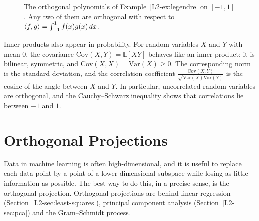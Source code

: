 \begin{figure}[ht]
    \centering
    \caption[Legendre polynomials]{The orthogonal polynomials of Example~\ref{L2-ex:legendre} on $[-1, 1]$. Any two of them are orthogonal with respect to $\langle f, g \rangle = \int_{-1}^1 f(x) g(x) \, dx$.}
    \label{L2-fig:legendre}
\end{figure}

\begin{remark}
    Inner products also appear in probability. For random variables $X$ and $Y$ with mean $0$, the covariance $\mathrm{Cov}(X, Y) = \mathbb{E}[XY]$ behaves like an inner product: it is bilinear, symmetric, and $\mathrm{Cov}(X, X) = \mathrm{Var}(X) \geq 0$. The corresponding norm is the standard deviation, and the correlation coefficient $\frac{\mathrm{Cov}(X, Y)}{\sqrt{\mathrm{Var}(X)\mathrm{Var}(Y)}}$ is the cosine of the angle between $X$ and $Y$. In particular, uncorrelated random variables are orthogonal, and the Cauchy--Schwarz inequality shows that correlations lie between $-1$ and $1$.
\end{remark}

\section{Orthogonal Projections}\label{L2-sec:projections}

Data in machine learning is often high-dimensional, and it is useful to replace each data point by a point of a lower-dimensional subspace while losing as little information as possible. The best way to do this, in a precise sense, is the orthogonal projection. Orthogonal projections are behind linear regression (Section~\ref{L2-sec:least-squares}), principal component analysis (Section~\ref{L2-sec:pca}) and the Gram--Schmidt process.


